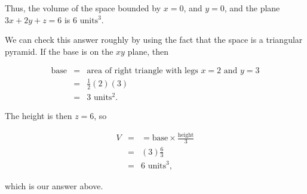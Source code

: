 Thus, the volume of the space bounded by $x=0$, and $y=0$, and the plane $3x+2y+z=6$ is $6\mbox{ units}^3$.

We can check this answer roughly by using the fact that the space is a triangular pyramid. If the base is on the $xy$ plane, then

\begin{eqnarray*}
	\mbox{base}&=&\mbox{area of right triangle with legs }x=2\mbox{ and }y=3\\
	&=&\frac{1}{2}\left(2\right)\left(3\right)\\
	&=&3\mbox{ units}^2.
\end{eqnarray*}

The height is then $z=6$, so

\begin{eqnarray*}
	V&=&=\mbox{base}\times\frac{\mbox{height}}{3}\\
	&=&\left(3\right)\frac{6}{3}\\
	&=&6\mbox{ units}^3,
\end{eqnarray*}

which is our answer above.
